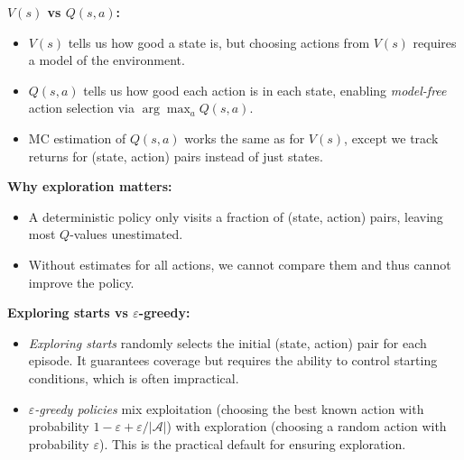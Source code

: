 \documentclass[journal, onecolumn]{IEEEtran}
\begin{document}
\begin{tcolorbox}[memorybox={Summary: From $V(s)$ to $Q(s,a)$}]
\textbf{$V(s)$ vs $Q(s,a)$:}
\begin{itemize}[leftmargin=1.5em, itemsep=2pt]
    \item $V(s)$ tells us how good a state is, but choosing actions from $V(s)$ requires a model of the environment.
    \item $Q(s,a)$ tells us how good each action is in each state, enabling \textit{model-free} action selection via $\arg\max_a Q(s,a)$.
    \item MC estimation of $Q(s,a)$ works the same as for $V(s)$, except we track returns for (state, action) pairs instead of just states.
\end{itemize}

\medskip

\textbf{Why exploration matters:}
\begin{itemize}[leftmargin=1.5em, itemsep=2pt]
    \item A deterministic policy only visits a fraction of (state, action) pairs, leaving most $Q$-values unestimated.
    \item Without estimates for all actions, we cannot compare them and thus cannot improve the policy.
\end{itemize}

\medskip

\textbf{Exploring starts vs $\varepsilon$-greedy:}
\begin{itemize}[leftmargin=1.5em, itemsep=2pt]
    \item \textit{Exploring starts} randomly selects the initial (state, action) pair for each episode. It guarantees coverage but requires the ability to control starting conditions, which is often impractical.
    \item \textit{$\varepsilon$-greedy policies} mix exploitation (choosing the best known action with probability $1 - \varepsilon + \varepsilon/|\mathcal{A}|$) with exploration (choosing a random action with probability $\varepsilon$). This is the practical default for ensuring exploration.
\end{itemize}
\end{tcolorbox}
\end{document}
